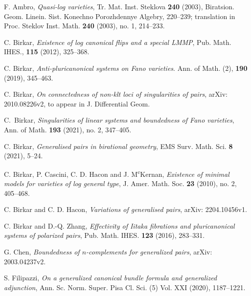 \documentclass[11pt]{amsart}
\numberwithin{equation}{section}
\theoremstyle{definition}
\theoremstyle{definition}
\theoremstyle{definition}
\begin{document}
    \begin{thebibliography}{ABCDE}

       F. Ambro, \textit{Quasi-log varieties},
      Tr. Mat. Inst. Steklova \textbf{240} (2003), Biratsion. Geom.
      Linein. Sist. Konechno Porozhdennye Algebry, 220--239;
      translation in Proc. Steklov Inst. Math. \textbf{240} (2003),
      no. 1, 214--233.

       C. Birkar, \textit{Existence of log
      canonical flips and a special LMMP}, Pub. Math. IHES.,
      \textbf{115} (2012), 325--368.

       C. Birkar, \textit{Anti-pluricanonical
      systems on Fano varieties}. Ann. of Math. (2), \textbf{190}
      (2019), 345--463.

       C. Birkar, \textit{On connectedness of
      non-klt loci of singularities of pairs}, arXiv: 2010.08226v2,
      to appear in J. Differential Geom.

      C.~Birkar, \textit{Singularities of linear systems and
      boundedness of {F}ano varieties}, Ann. of Math. \textbf{193}
      (2021), no. 2, 347--405.

        C. Birkar, \textit{Generalised pairs
      in birational geometry}, EMS Surv. Math. Sci. \textbf{8} (2021), 5--24.

      C. Birkar, P. Cascini, C. D. Hacon and J.
      M\textsuperscript{c}Kernan, \textit{Existence of minimal models
      for varieties of log general type}, J. Amer. Math. Soc.
      \textbf{23} (2010), no. 2, 405--468.

       C. Birkar and C. D. Hacon,
      \textit{Variations of generalised pairs}, arXiv: 2204.10456v1.

       C. Birkar and D.-Q. Zhang,
      \textit{Effectivity of Iitaka fibrations and pluricanonical
      systems of polarized pairs}, Pub. Math. IHES. \textbf{123}
      (2016), 283--331.

       G. Chen, \textit{Boundedness of
      $n$-complements for generalized pairs}, arXiv: 2003.04237v2.

       S. Filipazzi, \textit{On a generalized
      canonical bundle formula and generalized adjunction}, Ann. Sc.
      Norm. Super. Pisa Cl. Sci. (5) Vol. XXI (2020), 1187--1221.


\end{thebibliography}
\end{document}
